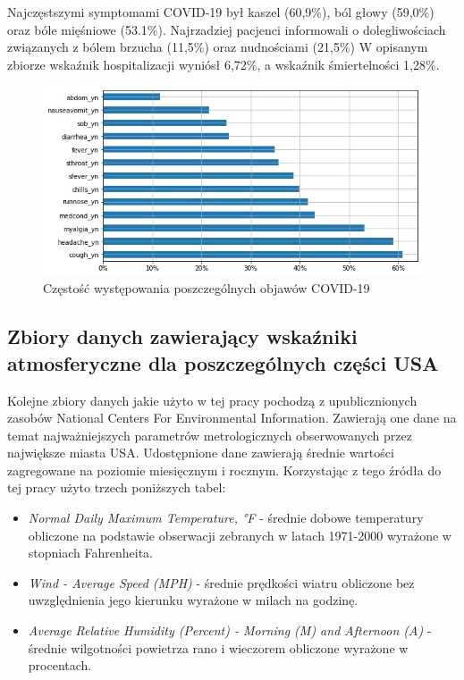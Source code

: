 \documentclass[polish, twoside, 12pt, a4paper]{article}
\theoremstyle{definition}
\theoremstyle{plain}
\theoremstyle{remark}
\begin{document}
Najczęstszymi symptomami COVID-19 był kaszel (60,9\%), ból głowy (59,0\%) oraz bóle mięśniowe (53.1\%). Najrzadziej pacjenci informowali o dolegliwościach związanych z bólem brzucha (11,5\%) oraz nudnościami (21,5\%) W opisanym zbiorze wskaźnik hospitalizacji wyniósł 6,72\%, a wskaźnik śmiertelności 1,28\%.

\begin{figure}[H]
\centering
\includegraphics[width=15cm]{symptoms-freq.jpg}
\caption{Częstość występowania poszczególnych objawów COVID-19}
\end{figure}



\subsection{Zbiory danych zawierający wskaźniki atmosferyczne dla poszczególnych części USA}

Kolejne zbiory danych jakie użyto w tej pracy pochodzą z upublicznionych zasobów National Centers For Environmental Information. Zawierają one dane na temat najważniejszych parametrów metrologicznych obserwowanych przez największe miasta USA. Udostępnione dane zawierają średnie wartości zagregowane na poziomie miesięcznym i rocznym. Korzystając z tego źródła do tej pracy użyto trzech poniższych tabel:
\begin{itemize}
  \item \emph{Normal Daily Maximum Temperature, °F} - średnie dobowe temperatury obliczone na podstawie obserwacji zebranych w latach 1971-2000 wyrażone w stopniach Fahrenheita.
  \item \emph{Wind - Average Speed (MPH)} - średnie prędkości wiatru obliczone bez uwzględnienia jego kierunku wyrażone w milach na godzinę.
  \item \emph{Average Relative Humidity (Percent) - Morning (M) and Afternoon (A)} - średnie wilgotności powietrza rano i wieczorem obliczone wyrażone w procentach.
\end{itemize}
\end{document}
